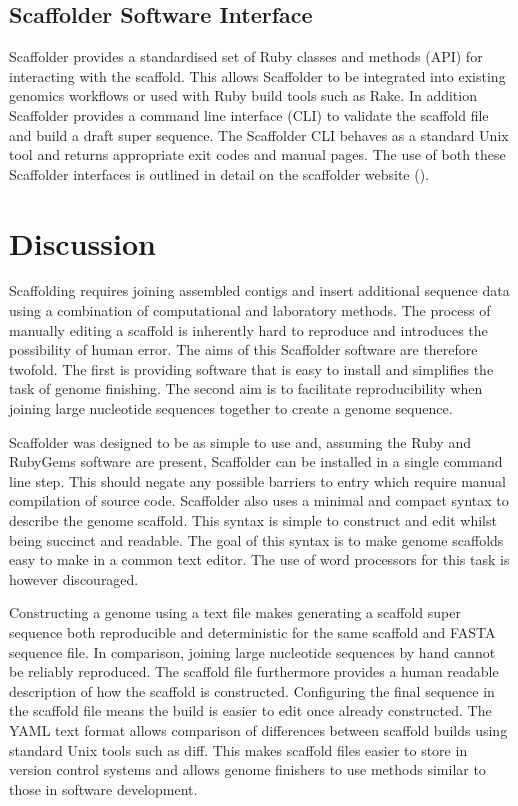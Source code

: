 \documentclass[10pt]{bmc_article}
\newenvironment{bmcformat}{\begin{raggedright}\baselineskip20pt\sloppy\setboolean{publ}{false}}{\end{raggedright}\baselineskip20pt\sloppy}
\begin{document}
\begin{bmcformat}
\subsection*{Scaffolder Software Interface} %

Scaffolder provides a standardised set of Ruby classes and methods (API) for
interacting with the scaffold. This allows Scaffolder to be integrated into
existing genomics workflows or used with Ruby build tools such as Rake. In
addition Scaffolder provides a command line interface (CLI) to validate the
scaffold file and build a draft super sequence. The Scaffolder CLI behaves as
a standard Unix tool and returns appropriate exit codes and manual pages. The
use of both these Scaffolder interfaces is outlined in detail on the scaffolder
website (\scaffolder). \pb

\section*{Discussion} %

Scaffolding requires joining assembled contigs and insert additional sequence
data using a combination of computational and laboratory methods. The process
of manually editing a scaffold is inherently hard to reproduce and introduces
the possibility of human error. The aims of this Scaffolder software are
therefore twofold. The first is providing software that is easy to install and
simplifies the task of genome finishing. The second aim is to facilitate
reproducibility when joining large nucleotide sequences together to create
a genome sequence. \pb

Scaffolder was designed to be as simple to use and, assuming the Ruby and
RubyGems software are present, Scaffolder can be installed in a single command
line step. This should negate any possible barriers to entry which require
manual compilation of source code. Scaffolder also uses a minimal and compact
syntax to describe the genome scaffold. This syntax is simple to construct and
edit whilst being succinct and readable. The goal of this syntax is to make
genome scaffolds easy to make in a common text editor. The use of word
processors for this task is however discouraged. \pb

Constructing a genome using a text file makes generating a scaffold super
sequence both reproducible and deterministic for the same scaffold and FASTA
sequence file. In comparison, joining large nucleotide sequences by hand cannot
be reliably reproduced. The scaffold file furthermore provides a human readable
description of how the scaffold is constructed. Configuring the final sequence
in the scaffold file means the build is easier to edit once already
constructed. The YAML text format allows comparison of differences between
scaffold builds using standard Unix tools such as diff. This makes scaffold
files easier to store in version control systems and allows genome finishers to
use methods similar to those in software development. \pb 


\end{bmcformat}
\end{document}
